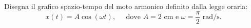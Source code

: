 

Disegna il grafico spazio-tempo del moto armonico definito dalla legge oraria:
$$
x(t)=A\cos{(\omega t)},\;\;\;\;\;\text{dove $A=2$ cm e $\omega=\frac{\pi}{2}$ rad/s.}
$$
